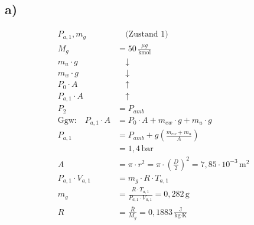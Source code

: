 

\subsection*{a)}

\begin{align*}
P_{a,1}, m_g & \quad \text{(Zustand 1)} \\
M_g &= 50 \, \frac{\mu g}{\text{kmol}} \\
m_u \cdot g & \quad \downarrow \\
m_w \cdot g & \quad \downarrow \\
P_0 \cdot A & \quad \uparrow \\
P_{a,1} \cdot A & \quad \uparrow \\
P_2 &= P_{amb} \\
\text{Ggw:} \quad P_{a,1} \cdot A &= P_0 \cdot A + m_{ew} \cdot g + m_u \cdot g \\
P_{a,1} &= P_{amb} + g \left( \frac{m_{ew} + m_u}{A} \right) \\
&= 1,4 \, \text{bar} \\
A &= \pi \cdot r^2 = \pi \cdot \left( \frac{D}{2} \right)^2 = 7,85 \cdot 10^{-3} \, \text{m}^2 \\
P_{a,1} \cdot V_{a,1} &= m_g \cdot R \cdot T_{a,1} \\
m_g &= \frac{R \cdot T_{a,1}}{P_{a,1} \cdot V_{a,1}} = 0,282 \, \text{g} \\
R &= \frac{\bar{R}}{M_g} = 0,1883 \, \frac{\text{J}}{\text{kg} \cdot \text{K}}
\end{align*}